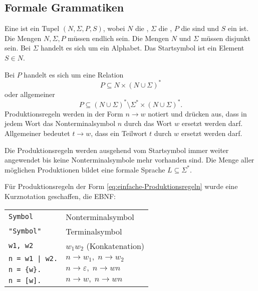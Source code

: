 \subsection{Formale Grammatiken}
\begin{definition}
Eine  ist ein Tupel $(N,\Sigma,P,S)$,
wobei $N$ die ,
$\Sigma$ die ,
$P$ die  sind
und $S$ ein  ist.
Die Mengen $N,\Sigma,P$ müssen endlich sein. Die Mengen $N$ und
$\Sigma$ müssen disjunkt sein. Bei $\Sigma$ handelt es sich um
ein Alphabet. Das Startsymbol ist ein Element $S\in N$.

Bei $P$ handelt es sich um eine Relation
\begin{equation}\label{eq:einfache-Produktionsregeln}
P\subseteq N\times (N\cup\Sigma)^*
\end{equation}
oder allgemeiner
\begin{equation}
P\subseteq (N\cup\Sigma)^*\setminus\Sigma^*\times (N\cup\Sigma)^*.
\end{equation}
Produktionsregeln werden in der Form $n\to w$ notiert und drücken aus,
dass in jedem Wort das Nonterminalsymbol $n$ durch das Wort $w$ ersetzt
werden darf. Allgemeiner bedeutet $t\to w$, dass ein Teilwort $t$
durch $w$ ersetzt werden darf.

Die Produktionsregeln werden ausgehend vom Startsymbol immer weiter
angewendet bis keine Nonterminalsymbole mehr vorhanden sind.
Die Menge aller möglichen Produktionen bildet
eine formale Sprache $L\subseteq\Sigma^*$.
\end{definition}

\noindent
Für Produktionsregeln der Form \eqref{eq:einfache-Produktionsregeln}
wurde eine Kurznotation geschaffen, die EBNF:

\begin{tabular}{l|l}
\verb|Symbol| & Nonterminalsymbol\\
\verb|"Symbol"| & Terminalsymbol\\
\verb|w1, w2| & $w_1w_2$ (Konkatenation)\\
\verb/n = w1 | w2./ & $n\to w_1,\; n\to w_2$\\
\verb|n = {w}.| & $n\to \varepsilon,\; n\to wn$\\
\verb|n = [w].| & $n\to w,\; n\to wn$
\end{tabular}


